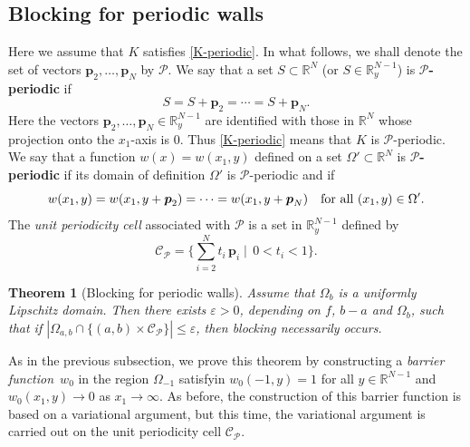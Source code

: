 \documentclass[a4paper,12pt,fullpage]{article}
\numberwithin{equation}{section}
\newtheorem{Thm}{Theorem}
\def\R{{\mathbb R}}
\def\ep{\varepsilon}
\begin{document}

\subsection{Blocking for periodic walls}
\label{ss:main-blocking-periodic}

Here we assume that $K$ satisfies \eqref{K-periodic}. In what follows, we shall denote the set of vectors ${\boldsymbol p}_2, \ldots, {\boldsymbol p}_{N}$ by ${\mathcal P}$. We say that a set $S\subset\R^N$ (or $S\in\R_y^{N-1}$) is {\bf ${\mathcal P}$-periodic} if 
\[
S=S+{\boldsymbol p}_2=\cdots=S+{\boldsymbol p}_{N}.
\]
Here the vectors ${\boldsymbol p}_2, \ldots, {\boldsymbol p}_{N}\in \R^{N-1}_y$ are identified with those in $\R^N$ whose projection onto the $x_1$-axis is $0$. Thus \eqref{K-periodic} means that $K$ is ${\mathcal P}$-periodic. We say that a function $w(x)=w(x_1,y)$ defined on a set $\Omega'\subset\R^N$ is {\bf ${\mathcal P}$-periodic} if its domain of definition $\Omega'$ is ${\mathcal P}$-periodic and if 
\[
w(x_1,y)=w(x_1,y+{\boldsymbol p}_2)=\cdots=w(x_1,y+{\boldsymbol p}_{N})\quad
\hbox{for all}\ (x_1,y)\in\Omega'.
\]
The {\it unit periodicity cell} associated with ${\mathcal P}$ is a set in $\R^{N-1}_y$ defined by
\begin{equation}\label{unit-cell}
{\mathcal C}_{\mathcal P}= \Big\{ \sum_{i= 2}^{N} t_i \,{\boldsymbol p}_i  \mid\,  0 < t_i< 1 \Big\}.
\end{equation}

\begin{Thm}[Blocking for periodic walls]\label{th:blocking-periodic}
Assume that $\Omega_{b}$ is a uniformly Lipschitz domain. Then there exists $\ep>0$, depending on $f$, $b-a$ and $\Omega_b$, such that if $|\Omega_{a,b} \cap \{ (a,b)\times {\mathcal C}_{\mathcal P} \}| \leq \ep$, then blocking necessarily occurs.
\end{Thm}

As in the previous subsection, we prove this theorem by constructing a {\em barrier function}~$w_{0}$ in the region $\Omega_{-1}$ satisfyin $w_{0}(-1, y) = 1$ for all $y\in \R^{N-1}$ and $w_{0}(x_{1}, y) \to 0$ as $x_{1}\to \infty$. As before, the construction of this barrier function is based on a variational argument, but this time, the variational argument is carried out on the unit periodicity cell ${\mathcal C}_{\mathcal P}$.

\end{document}
